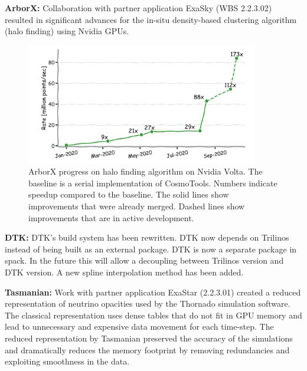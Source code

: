 \indent

{\bf ArborX:} Collaboration with partner application ExaSky (WBS 2.2.3.02)
resulted in significant advances for the in-situ density-based clustering
algorithm (halo finding) using Nvidia GPUs.

\begin{figure}[htb]
        \centering \includegraphics[width=4.0in]{projects/2.3.3-MathLibs/2.3.3.14-ALExa-ForTrilinos/arborx_hacc_progress.png} \caption{\label{fig:arborx-hacc}
        ArborX progress on halo finding algorithm on Nvidia Volta. The baseline
        is a serial implementation of CosmoTools. Numbers indicate speedup
        compared to the baseline. The solid lines show improvements that were
        already merged. Dashed lines show improvements that are in active
        development. }
\end{figure}

{\bf DTK:} DTK's build system has been rewritten. DTK now depends on Trilinos
instead of being built as an external package. DTK is now a separate package in
spack. In the future this will allow a decoupling between Trilinos version and
DTK version. A new spline interpolation method has been added.

{\bf Tasmanian:} Work with partner application ExaStar (2.2.3.01) created a
reduced representation of neutrino opacities used by the Thornado simulation
software. The classical representation uses dense tables that do not fit in
GPU memory and lead to unnecessary and expensive data movement for each time-step.
The reduced representation by Tasmanian preserved the accuracy of the simulations
and dramatically reduces the memory footprint by removing redundancies
and exploiting smoothness in the data.

